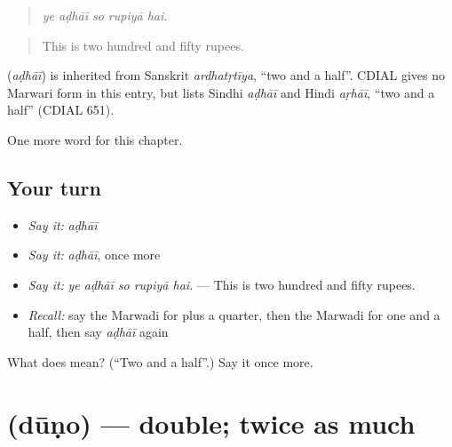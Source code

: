 \begin{quote}
    
\end{quote}

\begin{quote}
\emph{ye aḍhāī so rupiyā hai.}
\end{quote}

\begin{quote}
This is two hundred and fifty rupees.
\end{quote}

\begin{cousinweb}
\textbf{} (\emph{aḍhāī}) is inherited from Sanskrit \emph{ardhatṛtīya}, \textquotedblleft{}two and a half\textquotedblright{}. CDIAL gives no Marwari form in this entry, but lists Sindhi \emph{aḍhāī} and Hindi \emph{aṛhāī}, \textquotedblleft{}two and a half\textquotedblright{} (CDIAL 651).
\end{cousinweb}

\begin{grammarlens}[title={What you've built}]
One more word for this chapter.
\end{grammarlens}

\subsection*{Your turn}
\begin{itemize}
\raggedright
  \item \emph{Say it:} \emph{aḍhāī}
  \item \emph{Say it:} \emph{aḍhāī}, once more
  \item \emph{Say it:} \emph{ye aḍhāī so rupiyā hai.} — This is two hundred and fifty rupees.
  \item \emph{Recall:} say the Marwadi for plus a quarter, then the Marwadi for one and a half, then say \emph{aḍhāī} again
\end{itemize}

\begin{tcolorbox}[breakable,colback=teal!4,colframe=teal!35!black,title={Before you move on}]
What does  mean? (\textquotedblleft{}Two and a half\textquotedblright{}.) Say it once more.
\end{tcolorbox}
\section[\texorpdfstring{\mw{दूणो} (dūṇo)}{दूणो (dūṇo)}]{ (dūṇo) — double; twice as much}

